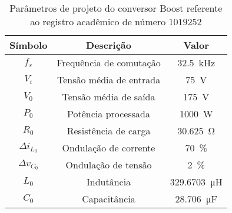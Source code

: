 \begin{table}[!ht]
\centering
\caption{Parâmetros de projeto do conversor Boost referente ao registro acadêmico de número $1019252$}
\label{tab:parametros}
\begin{tabular}{@{}ccc@{}}
\toprule
\textbf{Símbolo} & \textbf{Descrição} & \textbf{Valor}\\ \midrule
$f_s$ & Frequência de comutação & \SI{32.5}{\kilo\hertz}\\
$V_i$ & Tensão média de entrada  & \SI{75}{\V}\\
$V_0$ & Tensão média de saída  & \SI{175}{\V} \\
$P_0$ & Potência processada  & \SI{1000}{\W} \\
$R_0$ & Resistência de carga & \SI{30.625}{\ohm} \\
$\Delta{i_{L_0}}$  & Ondulação de corrente & \SI{70}{\%}\\
$\Delta{v_{C_0}}$  & Ondulação de tensão & \SI{2}{\%}\\
$L_0$ & Indutância & \SI{329.6703}{\micro\henry}\\
$C_0$ & Capacitância & \SI{28.706}{\micro\farad}\\
\bottomrule
\end{tabular}
\end{table}

